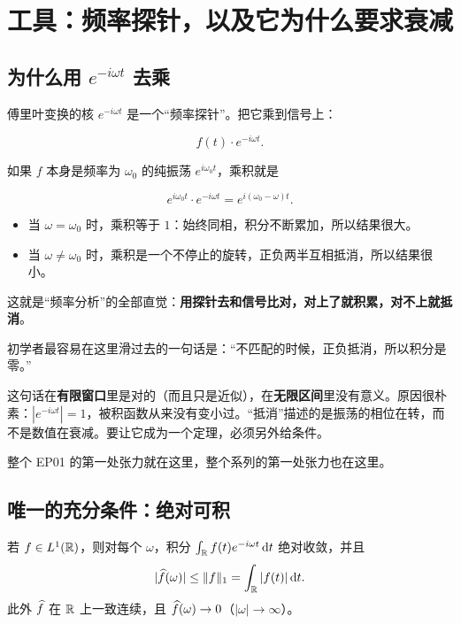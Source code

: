 \section{工具：频率探针，以及它为什么要求衰减}

\subsection{为什么用 $e^{-i\omega t}$ 去乘}

傅里叶变换的核 $e^{-i\omega t}$ 是一个“频率探针”。把它乘到信号上：

\begin{equation}
f(t)\cdot e^{-i\omega t}.
\end{equation}

如果 $f$ 本身是频率为 $\omega_0$ 的纯振荡 $e^{i\omega_0 t}$，乘积就是

\begin{equation}
e^{i\omega_0 t}\cdot e^{-i\omega t}=e^{i(\omega_0-\omega)t}.
\end{equation}

\begin{itemize}[leftmargin=1.6em,itemsep=0.3em]
\item 当 $\omega=\omega_0$ 时，乘积等于 $1$：始终同相，积分不断累加，所以结果很大。
\item 当 $\omega\neq\omega_0$ 时，乘积是一个不停止的旋转，正负两半互相抵消，所以结果很小。
\end{itemize}

这就是“频率分析”的全部直觉：\textbf{用探针去和信号比对，对上了就积累，对不上就抵消}。

\begin{ideabox}[但“抵消”不是一个证明]
初学者最容易在这里滑过去的一句话是：“不匹配的时候，正负抵消，所以积分是零。”

这句话在\textbf{有限窗口}里是对的（而且只是近似），在\textbf{无限区间}里没有意义。原因很朴素：$|e^{-i\omega t}|=1$，被积函数从来没有变小过。“抵消”描述的是振荡的相位在转，而不是数值在衰减。要让它成为一个定理，必须另外给条件。

整个 EP01 的第一处张力就在这里，整个系列的第一处张力也在这里。
\end{ideabox}

\subsection{唯一的充分条件：绝对可积}

\begin{prop}\label{prop:L1}
若 $f\in L^1(\mathbb{R})$，则对每个 $\omega$，积分 $\int_{\mathbb{R}}f(t)e^{-i\omega t}\mathop{}\!\mathrm{d} t$ 绝对收敛，并且
\begin{equation}
|\widehat{f}(\omega)|\le \|f\|_1=\int_{\mathbb{R}}|f(t)|\mathop{}\!\mathrm{d} t .
\end{equation}
此外 $\widehat{f}$ 在 $\mathbb{R}$ 上一致连续，且 $\widehat{f}(\omega)\to0$（$|\omega|\to\infty$）。
\end{prop}

